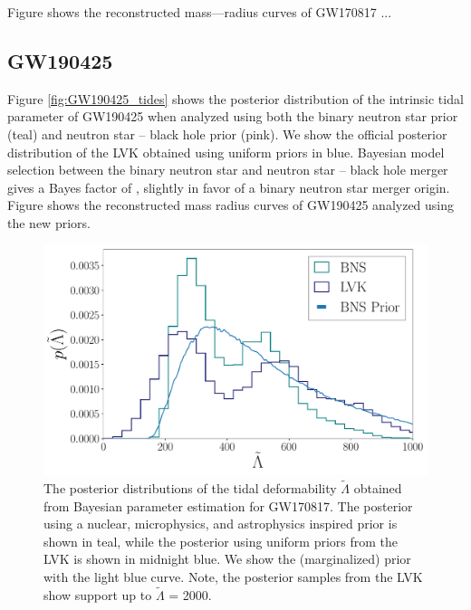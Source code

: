 \documentclass[twocolumn]{aastex631}
\begin{document}
Figure  shows the reconstructed mass---radius curves of GW170817 ... 
\subsection{GW190425}
Figure \ref{fig:GW190425_tides} shows the posterior distribution of the intrinsic tidal parameter of GW190425 when analyzed using both the binary neutron star prior (teal) and neutron star -- black hole prior (pink). We show the official posterior distribution  of the LVK obtained using uniform priors in blue. 
Bayesian model selection between the binary neutron star and neutron star -- black hole merger gives a Bayes factor of , slightly in favor of a binary neutron star merger origin. 
Figure  shows the reconstructed mass radius curves of GW190425 analyzed using the new priors.  
\begin{figure}
    \centering
    \includegraphics[width=1.\linewidth]{Fig_2_GW170817_lambda_tilde_posteriors_BNS.pdf}
    \caption{The posterior distributions of the tidal deformability $\tilde{\Lambda}$ obtained from Bayesian parameter estimation for GW170817. The posterior using a nuclear, microphysics, and astrophysics inspired prior is shown in teal, while the posterior using uniform priors from the LVK is shown in midnight blue. We show the (marginalized) prior with the light blue curve. Note, the posterior samples from the LVK show support up to $\tilde{\Lambda}$ = 2000. }
    \label{fig:GW170817_tides}
\end{figure}
\end{document}

